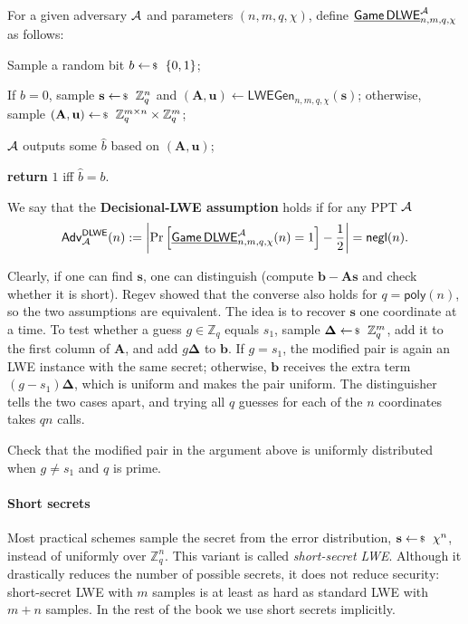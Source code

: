 \documentclass[../../book.tex]{subfiles}
\begin{document}
\begin{definition}\label{def:dlwe}
    For a given adversary $\mathcal{A}$ and parameters $(n,m,q,\chi)$, define $\underline{\mathsf{Game}\,\mathsf{DLWE}}^{\mathcal{A}}_{n,m,q,\chi}$ as follows:
    \begin{algoen}
        \item Sample a random bit $b \leftarrowS \{0,1\}$;
        \item If $b=0$, sample $\mathbf{s} \leftarrowS \mathbb{Z}_q^n$ and $(\mathbf{A},\mathbf{u}) \gets \mathsf{LWEGen}_{n,m,q,\chi}(\mathbf{s})$; otherwise, sample $(\mathbf{A},\mathbf{u}) \leftarrowS \mathbb{Z}_q^{m \times n} \times \mathbb{Z}_q^m$;
        \item $\mathcal{A}$ outputs some $\widehat{b}$ based on $(\mathbf{A},\mathbf{u})$;
        \item \textbf{return} $1$ iff $\widehat{b} = b$.
    \end{algoen}
    We say that the \textbf{Decisional-LWE assumption} holds if for any PPT $\mathcal{A}$
    \begin{equation*}
        \mathsf{Adv}^{\mathsf{DLWE}}_{\mathcal{A}}(n) := \left|\Pr\left[\underline{\mathsf{Game}\,\mathsf{DLWE}}^{\mathcal{A}}_{n,m,q,\chi}(n) = 1\right] - \frac{1}{2}\right| = \mathsf{negl}(n).
    \end{equation*}
\end{definition}

Clearly, if one can find $\mathbf{s}$, one can distinguish (compute $\mathbf{b}-\mathbf{A}\mathbf{s}$ and check whether it is short).
Regev showed that the converse also holds for $q = \mathsf{poly}(n)$, so the two assumptions are equivalent.
The idea is to recover $\mathbf{s}$ one coordinate at a time.
To test whether a guess $g \in \mathbb{Z}_q$ equals $s_1$, sample $\boldsymbol{\Delta} \leftarrowS \mathbb{Z}_q^m$, add it to the first column of $\mathbf{A}$, and add $g\boldsymbol{\Delta}$ to $\mathbf{b}$.
If $g = s_1$, the modified pair is again an LWE instance with the same secret; otherwise, $\mathbf{b}$ receives the extra term $(g-s_1)\boldsymbol{\Delta}$, which is uniform and makes the pair uniform.
The distinguisher tells the two cases apart, and trying all $q$ guesses for each of the $n$ coordinates takes $qn$ calls.

\begin{exercise}
    Check that the modified pair in the argument above is uniformly distributed when $g \neq s_1$ and $q$ is prime.
\end{exercise}

\paragraph{Short secrets}
Most practical schemes sample the secret from the error distribution, $\mathbf{s} \leftarrowS \chi^n$, instead of uniformly over $\mathbb{Z}_q^n$.
This variant is called \emph{short-secret LWE}.
Although it drastically reduces the number of possible secrets, it does not reduce security: short-secret LWE with $m$ samples is at least as hard as standard LWE with $m+n$ samples.
In the rest of the book we use short secrets implicitly.
\end{document}
